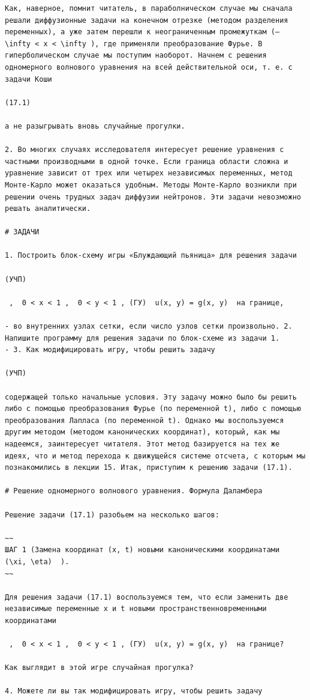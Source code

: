 \documentclass[
  ukrainian,
]{article}
\begin{document}
\begin{verbatim}
Как, наверное, помнит читатель, в параболническом случае мы сначала решали диффузионные задачи на конечном отрезке (методом разделения переменных), а уже затем перешли к неограниченным промежуткам (—  \infty < x < \infty ), где применяли преобразование Фурье. В гиперболическом случае мы поступим наоборот. Начнем с решения одномерного волнового уравнения на всей действительной оси, т. е. с задачи Коши

(17.1)

а не разыгрывать вновь случайные прогулки.

2. Во многих случаях исследователя интересует решение уравнения с частными производными в одной точке. Если граница области сложна и уравнение зависит от трех или четырех независимых переменных, метод Монте-Карло может оказаться удобным. Методы Монте-Карло возникли при решении очень трудных задач диффузии нейтронов. Эти задачи невозможно решать аналитически.

# ЗАДАЧИ

1. Построить блок-схему игры «Блуждающий пьяница» для решения задачи

(УЧП)

 ,  0 < x < 1 ,  0 < y < 1 , (ГУ)  u(x, y) = g(x, y)  на границе,

- во внутренних узлах сетки, если число узлов сетки произвольно. 2. Напишите программу для решения задачи по блок-схеме из задачи 1.
- 3. Как модифицировать игру, чтобы решить задачу

(УЧП) 

содержащей только начальные условия. Эту задачу можно было бы решить либо с помощью преобразования Фурье (по переменной t), либо с помощью преобразования Лапласа (по переменной t). Однако мы воспользуемся другим методом (методом канонических координат), который, как мы надеемся, заинтересует читателя. Этот метод базируется на тех же идеях, что и метод перехода к движущейся системе отсчета, с которым мы познакомились в лекции 15. Итак, приступим к решению задачи (17.1).

# Решение одномерного волнового уравнения. Формула Даламбера

Решение задачи (17.1) разобьем на несколько шагов:

~~
ШАГ 1 (Замена координат (x, t) новыми каноническими координатами   (\xi, \eta)  ).
~~

Для решения задачи (17.1) воспользуемся тем, что если заменить две независимые переменные x и t новыми пространственновременными координатами

 ,  0 < x < 1 ,  0 < y < 1 , (ГУ)  u(x, y) = g(x, y)  на границе?

Как выглядит в этой игре случайная прогулка?

4. Можете ли вы так модифицировать игру, чтобы решить задачу
\end{verbatim}
\end{document}

